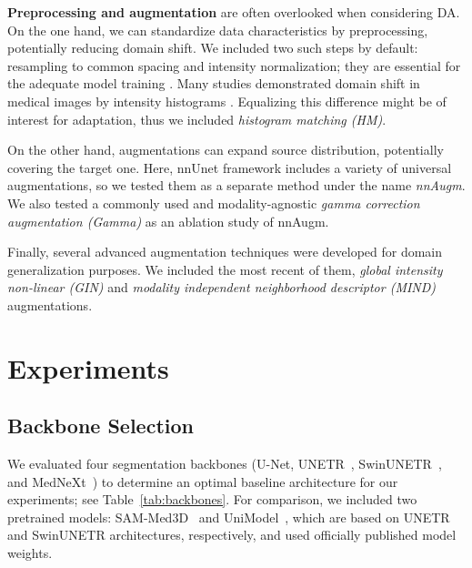 \textbf{Preprocessing and augmentation} are often overlooked when considering DA. On the one hand, we can standardize data characteristics by preprocessing, potentially reducing domain shift. We included two such steps by default: resampling to common spacing and intensity normalization; they are essential for the adequate model training \cite{kondrateva2022negligible}. Many studies demonstrated domain shift in medical images by intensity histograms \cite{crossmoda,se_medim,ihf}. Equalizing this difference might be of interest for adaptation, thus we included \textit{histogram matching (HM)}.

On the other hand, augmentations can expand source distribution, potentially covering the target one. Here, nnUnet framework \cite{nnunet} includes a variety of universal augmentations, so we tested them as a separate method under the name \textit{nnAugm}. We also tested a commonly used and modality-agnostic \textit{gamma correction augmentation (Gamma)} as an ablation study of nnAugm.

Finally, several advanced augmentation techniques were developed for domain generalization purposes. We included the most recent of them, \textit{global intensity non-linear (GIN)} \cite{gin} and \textit{modality independent neighborhood descriptor (MIND)} \cite{dg_tta} augmentations.



\section{Experiments}


\subsection{Backbone Selection}

We evaluated four segmentation backbones (U-Net, UNETR~\cite{unetr}, SwinUNETR~\cite{swinunetr}, and MedNeXt~\cite{mednext}) to determine an optimal baseline architecture for our experiments; see Table~\ref{tab:backbones}. For comparison, we included two pretrained models: SAM-Med3D~\cite{sammed} and UniModel~\cite{unimodel}, which are based on UNETR and SwinUNETR architectures, respectively, and used officially published model weights.



